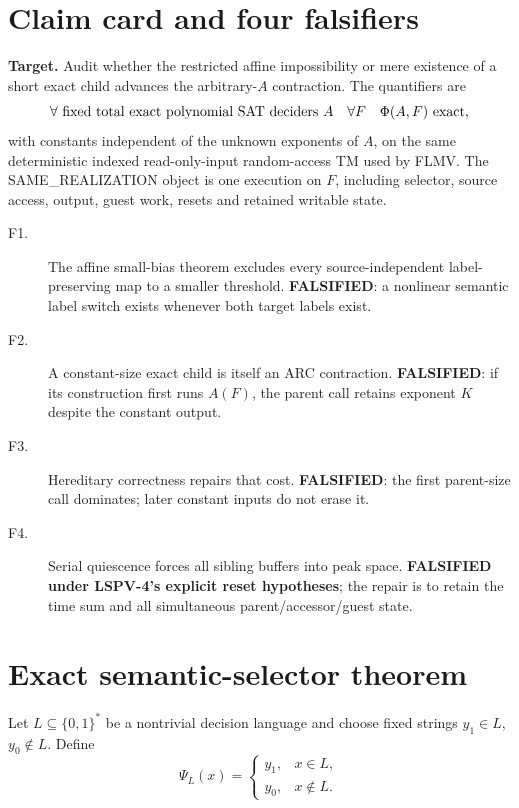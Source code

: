 \documentclass[11pt]{article}
\begin{document}
\section{Claim card and four falsifiers}
\textbf{Target.}  Audit whether the restricted affine impossibility or mere
existence of a short exact child advances the arbitrary-$A$ contraction.
The quantifiers are
\[
 \forall\hbox{ fixed total exact polynomial SAT deciders }A\quad
 \forall F\quad \Phi(A,F)\hbox{ exact},
\]
with constants independent of the unknown exponents of $A$, on the same
deterministic indexed read-only-input random-access TM used by FLMV.  The
SAME\_REALIZATION object is one execution on $F$, including selector,
source access, output, guest work, resets and retained writable state.

\begin{description}
\item[F1.] The affine small-bias theorem excludes every source-independent
label-preserving map to a smaller threshold.  \textbf{FALSIFIED}: a nonlinear
semantic label switch exists whenever both target labels exist.
\item[F2.] A constant-size exact child is itself an ARC contraction.
\textbf{FALSIFIED}: if its construction first runs $A(F)$, the parent call
retains exponent $K$ despite the constant output.
\item[F3.] Hereditary correctness repairs that cost.  \textbf{FALSIFIED}:
the first parent-size call dominates; later constant inputs do not erase it.
\item[F4.] Serial quiescence forces all sibling buffers into peak space.
\textbf{FALSIFIED under LSPV-4's explicit reset hypotheses}; the repair is to
retain the time sum and all simultaneous parent/accessor/guest state.
\end{description}

\section{Exact semantic-selector theorem}
Let $L\subseteq\{0,1\}^*$ be a nontrivial decision language and choose fixed
strings $y_1\in L$, $y_0\notin L$.  Define
\[
 \Psi_L(x)=\begin{cases}y_1,&x\in L,\\y_0,&x\notin L.\end{cases}
 \tag{1}
\]
\end{document}
